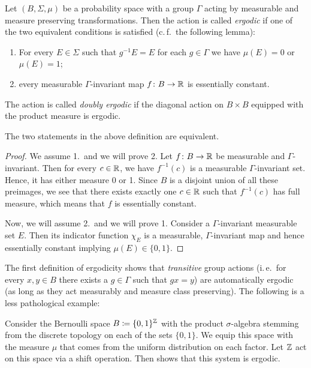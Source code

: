 \begin{defin}
  Let \((B, \Sigma, \mu)\) be a probability space with a group \(\Gamma\) acting by measurable and measure preserving transformations. Then the action is called \emph{ergodic} if one of the two equivalent conditions is satisfied (c.\,f.\ the following lemma):
  \begin{enumerate}
  \item For every \(E \in \Sigma\) such that \(g^{-1}E = E\) for each \(g \in \Gamma\) we have \(\mu(E) = 0\) or \(\mu(E) = 1\);
  \item every measurable \(\Gamma\)-invariant map \(f\colon B \to \mathbb{R}\) is essentially constant.
  \end{enumerate}
  The action is called \emph{doubly ergodic} if the diagonal action on \(B \times B\) equipped with the product measure is ergodic.
\end{defin}

\begin{lemma}
  The two statements in the above definition are equivalent.
\end{lemma}

\begin{proof}
  We assume 1.\ and we will prove 2. Let \(f \colon B \to \mathbb{R}\) be measurable and \(\Gamma\)-invariant. Then for every \(c \in \mathbb{R}\), we have \(f^{-1}(c)\) is a measurable \(\Gamma\)-invariant set. Hence, it has either measure 0 or 1. Since \(B\) is a disjoint union of all these preimages, we see that there exists exactly one \(c \in \mathbb{R}\) such that \(f^{-1}(c)\) has full measure, which means that \(f\) is essentially constant.

  Now, we will assume 2.\ and we will prove 1. Consider a \(\Gamma\)-invariant measurable set \(E\). Then its indicator function \(\chi_E\) is a measurable, \(\Gamma\)-invariant map and hence essentially constant implying \(\mu(E) \in \{0,1\}\).
\end{proof}

The first definition of ergodicity shows that \emph{transitive} group actions (i.\,e.\ for every \(x,y \in B\) there exists a \(g \in \Gamma\) such that \(gx = y\)) are automatically ergodic (as long as they act measurably and measure class preserving). The following is a less pathological example:

\begin{bsp}
  Consider the Bernoulli space \(B \coloneqq \{0,1\}^{\mathbb{Z}}\) with the product \(\sigma\)-algebra stemming from the discrete topology on each of the sets \(\{0,1\}\). We equip this space with the measure \(\mu\) that comes from the uniform distribution on each factor. Let \(\mathbb{Z}\) act on this space via a shift operation. Then \textcite[Example 20.26]{Klenke} shows that this system is ergodic.
\end{bsp}


